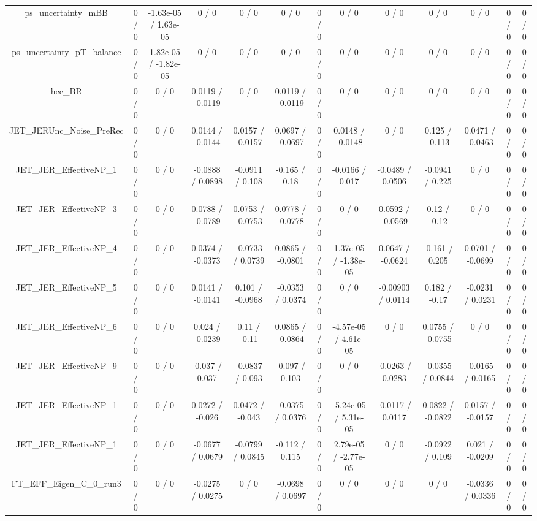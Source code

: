 \documentclass[10pt]{article}
\begin{document}
\begin{table}[htbp]
\begin{center}
\begin{tabular}{|c|c|c|c|c|c|c|c|c|c|c|c|c|}
  ps_uncertainty_mBB & 0 / 0 & -1.63e-05 / 1.63e-05 & 0 / 0 & 0 / 0 & 0 / 0 & 0 / 0 & 0 / 0 & 0 / 0 & 0 / 0 & 0 / 0 & 0 / 0 & 0 / 0 \\ 
  ps_uncertainty_pT_balance & 0 / 0 & 1.82e-05 / -1.82e-05 & 0 / 0 & 0 / 0 & 0 / 0 & 0 / 0 & 0 / 0 & 0 / 0 & 0 / 0 & 0 / 0 & 0 / 0 & 0 / 0 \\ 
  hcc_BR & 0 / 0 & 0 / 0 & 0.0119 / -0.0119 & 0 / 0 & 0.0119 / -0.0119 & 0 / 0 & 0 / 0 & 0 / 0 & 0 / 0 & 0 / 0 & 0 / 0 & 0 / 0 \\ 
  JET_JERUnc_Noise_PreRec & 0 / 0 & 0 / 0 & 0.0144 / -0.0144 & 0.0157 / -0.0157 & 0.0697 / -0.0697 & 0 / 0 & 0.0148 / -0.0148 & 0 / 0 & 0.125 / -0.113 & 0.0471 / -0.0463 & 0 / 0 & 0 / 0 \\ 
  JET_JER_EffectiveNP_1 & 0 / 0 & 0 / 0 & -0.0888 / 0.0898 & -0.0911 / 0.108 & -0.165 / 0.18 & 0 / 0 & -0.0166 / 0.017 & -0.0489 / 0.0506 & -0.0941 / 0.225 & 0 / 0 & 0 / 0 & 0 / 0 \\ 
  JET_JER_EffectiveNP_3 & 0 / 0 & 0 / 0 & 0.0788 / -0.0789 & 0.0753 / -0.0753 & 0.0778 / -0.0778 & 0 / 0 & 0 / 0 & 0.0592 / -0.0569 & 0.12 / -0.12 & 0 / 0 & 0 / 0 & 0 / 0 \\ 
  JET_JER_EffectiveNP_4 & 0 / 0 & 0 / 0 & 0.0374 / -0.0373 & -0.0733 / 0.0739 & 0.0865 / -0.0801 & 0 / 0 & 1.37e-05 / -1.38e-05 & 0.0647 / -0.0624 & -0.161 / 0.205 & 0.0701 / -0.0699 & 0 / 0 & 0 / 0 \\ 
  JET_JER_EffectiveNP_5 & 0 / 0 & 0 / 0 & 0.0141 / -0.0141 & 0.101 / -0.0968 & -0.0353 / 0.0374 & 0 / 0 & 0 / 0 & -0.00903 / 0.0114 & 0.182 / -0.17 & -0.0231 / 0.0231 & 0 / 0 & 0 / 0 \\ 
  JET_JER_EffectiveNP_6 & 0 / 0 & 0 / 0 & 0.024 / -0.0239 & 0.11 / -0.11 & 0.0865 / -0.0864 & 0 / 0 & -4.57e-05 / 4.61e-05 & 0 / 0 & 0.0755 / -0.0755 & 0 / 0 & 0 / 0 & 0 / 0 \\ 
  JET_JER_EffectiveNP_9 & 0 / 0 & 0 / 0 & -0.037 / 0.037 & -0.0837 / 0.093 & -0.097 / 0.103 & 0 / 0 & 0 / 0 & -0.0263 / 0.0283 & -0.0355 / 0.0844 & -0.0165 / 0.0165 & 0 / 0 & 0 / 0 \\ 
  JET_JER_EffectiveNP_1 & 0 / 0 & 0 / 0 & 0.0272 / -0.026 & 0.0472 / -0.043 & -0.0375 / 0.0376 & 0 / 0 & -5.24e-05 / 5.31e-05 & -0.0117 / 0.0117 & 0.0822 / -0.0822 & 0.0157 / -0.0157 & 0 / 0 & 0 / 0 \\ 
  JET_JER_EffectiveNP_1 & 0 / 0 & 0 / 0 & -0.0677 / 0.0679 & -0.0799 / 0.0845 & -0.112 / 0.115 & 0 / 0 & 2.79e-05 / -2.77e-05 & 0 / 0 & -0.0922 / 0.109 & 0.021 / -0.0209 & 0 / 0 & 0 / 0 \\ 
  FT_EFF_Eigen_C_0_run3 & 0 / 0 & 0 / 0 & -0.0275 / 0.0275 & 0 / 0 & -0.0698 / 0.0697 & 0 / 0 & 0 / 0 & 0 / 0 & 0 / 0 & -0.0336 / 0.0336 & 0 / 0 & 0 / 0 \\ 

\end{tabular}
\end{center}
\end{table}
\end{document}
